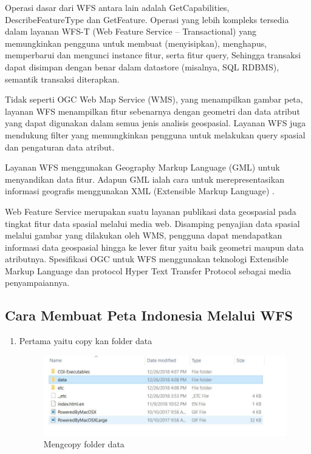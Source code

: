 Operasi dasar dari WFS antara lain adalah GetCapabilities, DescribeFeatureType dan GetFeature. Operasi yang lebih kompleks tersedia dalam layanan WFS-T (Web Feature Service – Transactional) yang memungkinkan pengguna untuk membuat (menyisipkan), menghapus, memperbarui dan mengunci instance fitur, serta fitur query, Sehingga transaksi dapat disimpan dengan benar dalam datastore (misalnya, SQL RDBMS), semantik transaksi diterapkan.

Tidak seperti OGC Web Map Service (WMS), yang menampilkan gambar peta, layanan WFS menampilkan fitur sebenarnya dengan geometri dan data atribut yang dapat digunakan dalam semua jenis analisis geospasial. Layanan WFS juga mendukung filter yang memungkinkan pengguna untuk melakukan query spasial dan pengaturan data atribut.

Layanan WFS menggunakan Geography Markup Language (GML) untuk menyandikan data fitur. Adapun GML ialah cara untuk merepresentasikan informasi geografis menggunakan XML (Extensible Markup Language) \cite{adityapeluang}.

Web Feature Service merupakan suatu layanan publikasi data geospasial pada tingkat fitur data spasial melalui media web. Disamping penyajian data spasial melalui gambar yang dilakukan oleh WMS, pengguna dapat mendapatkan informasi data geospasial hingga ke lever fitur yaitu baik geometri maupun data atributnya. Spesifikasi OGC untuk WFS menggunakan teknologi Extensible Markup Language dan protocol Hyper Text Transfer Protocol sebagai media penyampaiannya.

\subsection{Cara Membuat Peta Indonesia Melalui WFS}
\begin{enumerate}
\item Pertama yaitu copy kan folder data
\begin{figure}[htbp]
\centering
\includegraphics[width=1\textwidth]{pictures/Mengcopy_folder_data}
\caption{Mengcopy folder data}
\label{labelgambar2}
\end{figure}

\end{enumerate}
